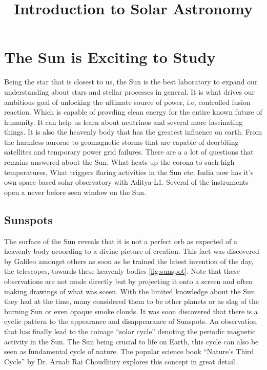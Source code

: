 \documentclass{../template/texnote}
\title{\textbf{Introduction to Solar Astronomy}}[author={Linn Abraham}]
\begin{document}
    \maketitle {}

\section{The Sun is Exciting to Study}
Being the star that is closest to us, the Sun is the best laboratory to expand our understanding about stars and stellar processes in general.
It is what drives our ambitious goal of unlocking the ultimate source of power, i.e, controlled fusion reaction.
Which is capable of provding clean energy for the entire known future of humanity.
It can help us learn about neutrinos and several more fascinating things.
It is also the heavenly body that has the greatest influence on earth. From the harmless aurorae to geomagnetic storms that are capable of deorbiting satellites and 
temporary power grid failures.
There are a a lot of questions that remains answered about the Sun.
What heats up the corona to such high temperatures, What triggers flaring activities in the Sun etc.
India now has it's own space based solar observatory with Aditya-L1. Several of the instruments open a never before seen window on the Sun.

\subsection{Sunspots}
The surface of the Sun reveals that it is not a perfect orb as expected of a heavenly body acoording to a divine picture of creation.
This fact was discovered by Galileo amongst others as soon as he trained the latest invention of the day, the telescopes,  towards these heavenly bodies \ref{fig:sunspot}.
         Note that these observations are not made directly but by projecting it onto a screen and often making drawings of what was sceen.
With the limited knowledge about the Sun they had at the time, many considered them to be other planets or as slag of the burning Sun or even opaque smoke clouds.
It was soon discovered that there is a cyclic pattern to the appearance and disappearance of Sunspots.
An observation that has finally lead to the coinage ``solar cycle'' denoting the periodic magnetic activity in the Sun.
The Sun being crucial to life on Earth, this cycle can also be seen as fundamental cycle of nature. 
The popular science book ``Nature's Third Cycle'' by Dr. Arnab Rai Choudhury explores this concept in great detail.
\end{document}
